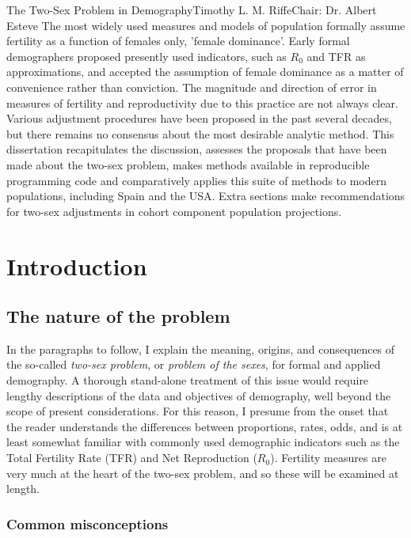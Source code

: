 \documentclass[reqno,12pt,oneside,a4paper]{report} %
\theoremstyle{plain}
\theoremstyle{definition}
\theoremstyle{remark}
\numberwithin{theorem}{chapter}     %
\begin{document}
\startabstractpage
{The Two-Sex Problem in Demography}{Timothy L. M. Riffe}{Chair: Dr. Albert Esteve}
The most widely used measures and models of population formally assume fertility as a function of females only, 
'female dominance'. Early formal demographers proposed presently used indicators, such as $R_{0}$ and TFR as 
approximations, and accepted the assumption of female dominance as a matter of convenience rather than conviction.
 The magnitude and direction of error in measures of fertility and reproductivity due to this practice are not 
 always clear. Various adjustment procedures have been proposed in the past several decades, but there remains no 
 consensus about the most desirable analytic method. This dissertation recapitulates the discussion,  assesses 
 the proposals that have been made about the two-sex problem, makes methods available in reproducible programming 
 code and comparatively applies this suite of methods to modern populations, including Spain and the USA. Extra 
 sections make recommendations for two-sex adjustments in cohort component population projections.
\label{Abstract}

\startthechapters 

 \chapter{Introduction}
 \label{chap:Intro}

\section{The nature of the problem}

In the paragraphs to follow, I explain the meaning, origins, and consequences of the so-called \textit{two-sex problem}, or \textit{problem of the sexes}, for formal and applied demography. A thorough stand-alone treatment of this issue would require lengthy descriptions of the data and objectives of demography, well beyond the scope of present considerations. For this reason, I presume from the onset that the reader understands the differences between proportions, rates, odds, and is at least somewhat familiar with commonly used demographic indicators such as the Total Fertility Rate (TFR) and Net Reproduction ($R_0$). Fertility measures are very much at the heart of the two-sex problem, and so these will be examined at length.

	\subsection{Common misconceptions}
\end{document}
